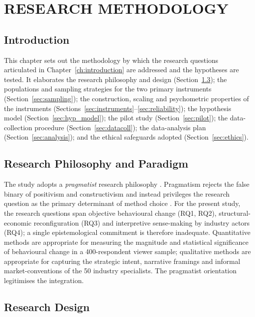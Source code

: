 \chapter{RESEARCH METHODOLOGY}
\label{ch:methodology}

\section{Introduction}
\label{sec:meth_intro}

This chapter sets out the methodology by which the research questions
articulated in Chapter~\ref{ch:introduction} are addressed and the
hypotheses are tested.  It elaborates the research philosophy and
design (Section~\ref{sec:design}); the populations and sampling
strategies for the two primary instruments
(Section~\ref{sec:sampling}); the construction, scaling and
psychometric properties of the instruments
(Sections~\ref{sec:instruments}--\ref{sec:reliability}); the
hypothesis model (Section~\ref{sec:hyp_model}); the pilot study
(Section~\ref{sec:pilot}); the data-collection procedure
(Section~\ref{sec:datacoll}); the data-analysis plan
(Section~\ref{sec:analysis}); and the ethical safeguards adopted
(Section~\ref{sec:ethics}).

\section{Research Philosophy and Paradigm}
\label{sec:philosophy}

The study adopts a \emph{pragmatist} research philosophy
\citep{creswell2018,morgan2014}.  Pragmatism rejects the false binary
of positivism and constructivism and instead privileges the research
question as the primary determinant of method choice
\citep{tashakkori2010,johnson2007}.  For the present study, the
research questions span objective behavioural change (RQ1, RQ2),
structural-economic reconfiguration (RQ3) and interpretive
sense-making by industry actors (RQ4); a single epistemological
commitment is therefore inadequate.  Quantitative methods are
appropriate for measuring the magnitude and statistical
significance of behavioural change in a 400-respondent viewer
sample; qualitative methods are appropriate for capturing the
strategic intent, narrative framings and informal market-conventions
of the 50 industry specialists.  The pragmatist orientation legitimises
the integration.

\section{Research Design}
\label{sec:design}

